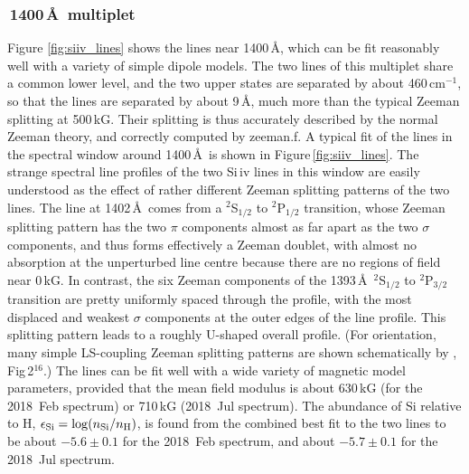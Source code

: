 \documentclass[fleqn,usenatbib]{mnras}
\begin{document}
\subsubsection{\,1400\,\AA\ multiplet}
\label{sec: siiv}
Figure \ref{fig:siiv_lines} shows the  lines near 1400\,\AA, which can be fit reasonably well with a variety of simple dipole models. The two lines of this multiplet share a common lower level, and the two upper states are separated by about 460\,cm$^{-1}$, so that the lines are separated by about 9\,\AA, much more than the typical Zeeman splitting at 500\,kG. Their splitting is thus accurately described by the normal Zeeman theory, and correctly computed by {\sc zeeman.f}. A typical fit of the lines in the spectral window around 1400\,\AA\ is shown in Figure\,\ref{fig:siiv_lines}. The strange spectral line profiles of the two Si\,{\sc iv} lines in this window are easily understood as the effect of rather different Zeeman splitting patterns of the two lines. The line at 1402\,\AA\ comes from a $^2$S$_{1/2}$ to $^2$P$_{1/2}$ transition, whose Zeeman splitting pattern has the two $\pi$ components almost as far apart as the two $\sigma$ components, and thus forms effectively a Zeeman doublet, with almost no absorption at the unperturbed line centre because there are no regions of field near 0\,kG. In contrast, the six Zeeman components of the 1393\,\AA\ $^2$S$_{1/2}$ to $^2$P$_{3/2}$ transition are pretty uniformly spaced through the profile, with the most displaced and weakest $\sigma$ components at the outer edges of the line profile.  This splitting pattern leads to a roughly U-shaped overall profile. (For orientation, many simple LS-coupling Zeeman splitting patterns are shown schematically by \citealt{condon+shortley35-1}, Fig\,2$^{16}$.) The lines can be fit well with a wide variety of magnetic model parameters, provided that the mean field modulus is about 630\,kG (for the 2018~Feb spectrum) or 710\,kG (2018~Jul spectrum). The abundance of Si relative to H, $\epsilon_{\rm Si} = \log(n_{\rm Si}/n_{\rm H})$, is found from the combined best fit to the two lines to be about $-5.6 \pm 0.1$ for the 2018~Feb spectrum, and about $-5.7 \pm 0.1$ for the 2018~Jul spectrum.
\end{document}
